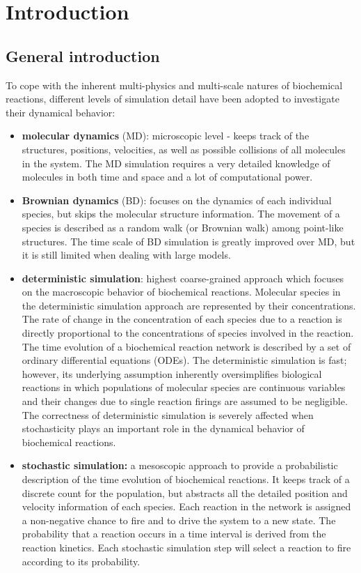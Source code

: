 \graphicspath{{chapters/01/images/}}
\chapter{Introduction}

\section{General introduction}
To cope with the inherent multi-physics and multi-scale natures of biochemical reactions, different levels of simulation detail have been adopted to investigate their dynamical behavior:

\begin{itemize}
  \item \textbf{molecular dynamics} (MD): microscopic level - keeps track of the structures, positions, velocities, as well as possible collisions of all molecules in the system.
     The MD simulation requires a very detailed knowledge of molecules in both time and space and a lot of computational power.
  \item \textbf{Brownian dynamics} (BD): focuses on the dynamics of each individual species, but skips the molecular structure information.
     The movement of a species is described as a random walk (or Brownian walk) among point-like structures.
     The time scale of BD simulation is greatly improved over MD, but it is still limited when dealing with large models.
  \item \textbf{deterministic simulation}: highest coarse-grained approach which focuses on the macroscopic behavior of biochemical reactions.
    Molecular species in the deterministic simulation approach are represented by their concentrations.
    The rate of change in the concentration of each species due to a reaction is directly proportional to the concentrations of species involved in the reaction.
    The time evolution of a biochemical reaction network is described by a set of ordinary differential equations (ODEs).
    The deterministic simulation is fast; however, its underlying assumption inherently oversimplifies biological reactions in which populations of molecular species are continuous variables and their changes due to single reaction firings are assumed to be negligible.
    The correctness of deterministic simulation is severely affected when stochasticity plays an important role in the dynamical behavior of biochemical reactions.
  \item \textbf{stochastic simulation:} a mesoscopic approach to provide a probabilistic description of the time evolution of biochemical reactions.
    It keeps track of a discrete count for the population, but abstracts all the detailed position and velocity information of each species.
    Each reaction in the network is assigned a non-negative chance to fire and to drive the system to a new state.
    The probability that a reaction occurs in a time interval is derived from the reaction kinetics.
    Each stochastic simulation step will select a reaction to fire according to its probability.
\end{itemize}


